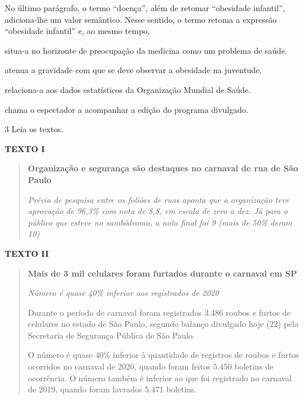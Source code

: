 No último parágrafo, o termo ``doença'', além de retomar ``obesidade
infantil'', adiciona-lhe um valor semântico. Nesse sentido, o termo
retoma a expressão ``obesidade infantil'' e, ao mesmo tempo,

\begin{escolha}
\item situa-a no horizonte de preocupação da medicina como um problema de
saúde.

\item atenua a gravidade com que se deve observar a obesidade na juventude.

\item relaciona-a aos dados estatísticos da Organização Mundial de Saúde.

\item chama o espectador a acompanhar a edição do programa divulgado.
\end{escolha}

\num{3} Leia os textos.

\textbf{TEXTO I}

\begin{quote}
\textbf{Organização e segurança são destaques no carnaval de rua de São
Paulo}

\emph{Prévia de pesquisa entre os foliões de ruas aponta que a
organização teve aprovação de 96,3\% com nota de 8,8, em escala de zero
a dez. Já para o público que esteve no sambódromo, a nota final foi 9
(mais de 50\% deram 10)}

\end{quote}


\textbf{TEXTO II}

\begin{quote}
\textbf{Mais de 3 mil celulares foram furtados durante o carnaval em SP}

\emph{Número é quase 40\% inferior aos registrados de 2020}

Durante o período de carnaval foram registrados 3.486 roubos e furtos de
celulares no estado de São Paulo, segundo balanço divulgado hoje (22)
pela Secretaria de Segurança Pública de São Paulo.

O número é quase 40\% inferior à quantidade de registros de roubos e
furtos ocorridos no carnaval de 2020, quando foram feitos 5.450 boletins
de ocorrência. O número também é inferior ao que foi registrado no
carnaval de 2019, quando foram lavrados 5.471 boletins.

\end{quote}

